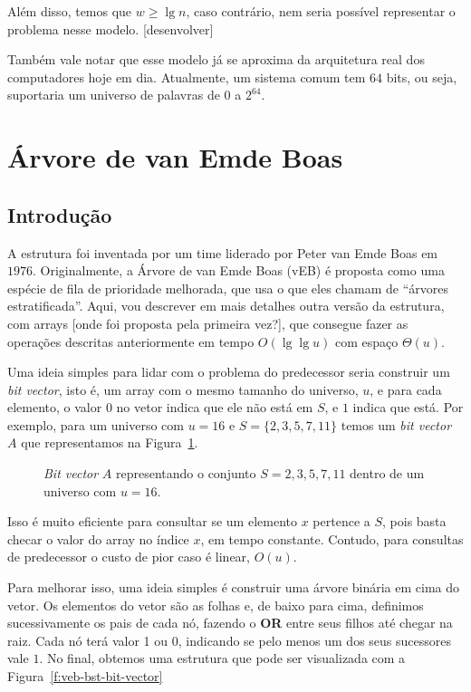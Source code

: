 Além disso, temos que $w\geq \lg n$, caso contrário, nem seria possível
representar o problema nesse modelo. [desenvolver]

Também vale notar que esse modelo já se aproxima da arquitetura real dos
computadores hoje em dia. Atualmente, um sistema comum tem $64$ bits, ou seja,
suportaria um universo de palavras de $0$ a $2^{64}$.

\section{Árvore de van Emde Boas}

\subsection{Introdução}

A estrutura foi inventada por um time liderado por Peter van Emde Boas em
$1976$. Originalmente, a Árvore de van Emde Boas (vEB) é proposta como uma
espécie de fila de prioridade melhorada, que usa o que eles chamam de ``árvores
estratificada''. Aqui, vou descrever em mais detalhes outra versão da estrutura,
com arrays [onde foi proposta pela primeira vez?], que consegue fazer as
operações descritas anteriormente em tempo $O(\lg \lg u)$ com espaço
$\Theta(u)$.

Uma ideia simples para lidar com o problema do predecessor seria construir um
\textit{bit vector}, isto é, um array com o mesmo tamanho do universo, $u$, e
para cada elemento, o valor $0$ no vetor indica que ele não está em $S$, e $1$
indica que está. Por exemplo, para um universo com $u=16$ e $S=\{2,3,5,7,11\}$
temos um \textit{bit vector} $A$ que representamos na
Figura~\ref{f:veb-bit-vector}.

\begin{figure}[h]
\centering
{}
\caption{\textit{Bit vector} $A$ representando o conjunto $S={2,3,5,7,11}$
dentro de um universo com $u=16$. \label{f:veb-bit-vector}}
\end{figure}

Isso é muito eficiente para consultar se um elemento $x$ pertence a $S$, pois
basta checar o valor do array no índice $x$, em tempo constante. Contudo, para
consultas de predecessor o custo de pior caso é linear, $O(u)$. 

Para melhorar isso, uma ideia simples é construir uma árvore binária em cima do
vetor. Os elementos do vetor são as folhas e, de baixo para cima, definimos
sucessivamente os pais de cada nó, fazendo o \textbf{OR} entre seus filhos até
chegar na raiz. Cada nó terá valor 1 ou 0, indicando se pelo menos um dos seus
sucessores vale $1$. No final, obtemos uma estrutura que pode ser visualizada
com a Figura~\ref{f:veb-bst-bit-vector}

